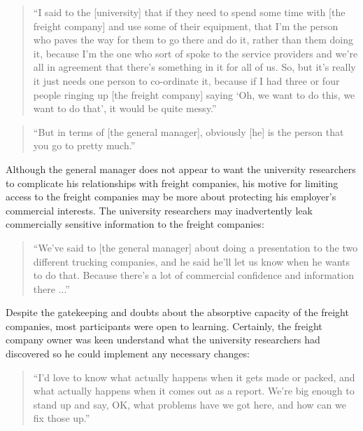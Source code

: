 \begin{quote}
\small
\enquote{I said to the [university] that if they need to spend some time with [the freight company] and use some of their equipment, that I'm the person who paves the way for them to go there and do it, rather than them doing it, because I'm the one who sort of spoke to the service providers and we’re all in agreement that there's something in it for all of us. So, but it's really it just needs one person to co-ordinate it, because if I had three or four people ringing up [the freight company] saying \enquote{Oh, we want to do this, we want to do that}, it would be quite messy.} \\
\end{quote}

\begin{quote}
\small
\enquote{But in terms of [the general manager], obviously [he] is the person that you go to pretty much.} \\
\end{quote}

Although the general manager does not appear to want the university researchers to complicate his relationships with freight companies, his motive for limiting access to the freight companies may be more about protecting his employer's commercial interests. The university researchers may inadvertently leak commercially sensitive information to the freight companies:

\begin{quote}
\small
\enquote{We've said to [the general manager] about doing a presentation to the two different trucking companies, and he said he'll let us know when he wants to do that. Because there’s a lot of commercial confidence and information there ...} \\
\end{quote}

Despite the gatekeeping and doubts about the absorptive capacity of the freight companies, most participants were open to learning. Certainly, the freight company owner was keen understand what the university researchers had discovered so he could implement any necessary changes:

\begin{quote}
\small
\enquote{I'd love to know what actually happens when it gets made or packed, and what actually happens when it comes out as a report. We're big enough to stand up and say, OK, what problems have we got here, and how can we fix those up.} \\
\end{quote}

